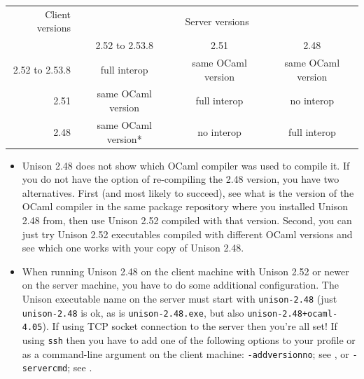 \documentclass{article}
\begin{document}
\vspace{1em}
\begin{tabular}{r||c|c|c}
  Client versions & \multicolumn{3}{c}{Server versions} \\
  & 2.52 to 2.53.8 & 2.51  & 2.48 \\
  \hline \hline
  2.52 to 2.53.8 & full interop & same OCaml version & same OCaml version \\
  \hline
  2.51 & same OCaml version & full interop & no interop \\
  \hline
  2.48 & same OCaml version* & no interop & full interop \\
\end{tabular}
\vspace{2em}

\begin{itemize}
\item Unison 2.48 does not show which OCaml compiler was used to compile it.
If you do not have the option of re-compiling the 2.48 version, you have
two alternatives.  First (and most likely to succeed), see what is the version
of the OCaml compiler in the same package repository where you installed
Unison 2.48 from, then use Unison 2.52 compiled with that version.
Second, you can just try Unison 2.52 executables compiled with different
OCaml versions and see which one works with your copy of Unison 2.48.
\item When running Unison 2.48 on the client machine with Unison 2.52 or
newer on the server machine, you have to do some additional configuration.
The Unison executable name on the server must start with \verb|unison-2.48|
(just \verb|unison-2.48| is ok, as is \verb|unison-2.48.exe|, but also
\verb|unison-2.48+ocaml-4.05|).  If using TCP socket connection to the
server then you're all set!  If using {\tt ssh} then you have to add one
of the following options to your profile or as a command-line argument
on the client machine: \verb|-addversionno|; see
, or \verb|-servercmd|; see
.
\end{itemize}




\end{document}
